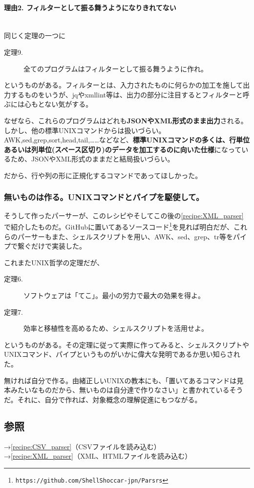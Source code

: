 \paragraph{理由2. フィルターとして振る舞うようになりきれてない}　\\
同じく定理の一つに
\begin{description}
  \item[定理9.] 全てのプログラムはフィルターとして振る舞うように作れ。
\end{description}
というものがある。フィルターとは、入力されたものに何らかの加工を施して出力するものをいうが、jqやxmllint等は、出力の部分に注目するとフィルターと呼ぶには心もとない気がする。

なぜなら、これらのプログラムはどれも\textbf{JSONやXML形式のまま出力}される。しかし、他の標準UNIXコマンドからは扱いづらい。AWK,sed,grep,sort,head,tail,……などなど、\textbf{標準UNIXコマンドの多くは、行単位あるいは列単位(スペース区切り)のデータを加工するのに向いた仕様}になっているため、JSONやXML形式のままだと結局扱いづらい。

だから、行や列の形に正規化するコマンドであってほしかった。

\subsubsection*{無いものは作る。UNIXコマンドとパイプを駆使して。}

そうして作ったパーサーが、このレシピやそしてこの後の\ref{recipe:XML_parser}で紹介したものだ。GitHubに置いてあるソースコード\footnote{\verb|https://github.com/ShellShoccar-jpn/Parsrs|}を見れば明白だが、これらのパーサーもまた、シェルスクリプトを用い、AWK、sed、grep、tr等をパイプで繋ぐだけで実装した。

これまたUNIX哲学の定理だが、
\begin{description}
  \item[定理6.] ソフトウェアは「てこ」。最小の労力で最大の効果を得よ。
  \item[定理7.] 効率と移植性を高めるため、シェルスクリプトを活用せよ。
\end{description}
というものがある。その定理に従って実際に作ってみると、シェルスクリプトやUNIXコマンド、パイプというものがいかに偉大な発明であるか思い知らされた。

無ければ自分で作る。由緒正しいUNIXの教本にも、「置いてあるコマンドは見本みたいなものだから、無いものは自分達で作りなさい」と書かれているそうだ。それに、自分で作れば、対象概念の理解促進にもつながる。

\subsection*{参照}

\noindent
→\ref{recipe:CSV_parser}（CSVファイルを読み込む） \\
→\ref{recipe:XML_parser}（XML、HTMLファイルを読み込む）
